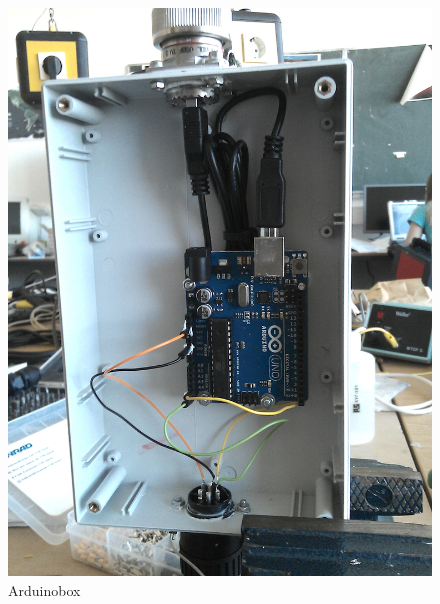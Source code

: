\documentclass[12pt,a4paper]{scrartcl}
\begin{document}
\begin{figure}[htb]
\begin{minipage}[H]{8cm}
	\centering
	\includegraphics[scale=.111]{hardwareimages/arduinobox.jpg}
	\caption{Arduinobox}
	\label{arduinobox}
\end{minipage}
\hfill
\begin{minipage}[H]{8cm}
	\centering

\end{minipage}
\end{figure}
\end{document}
